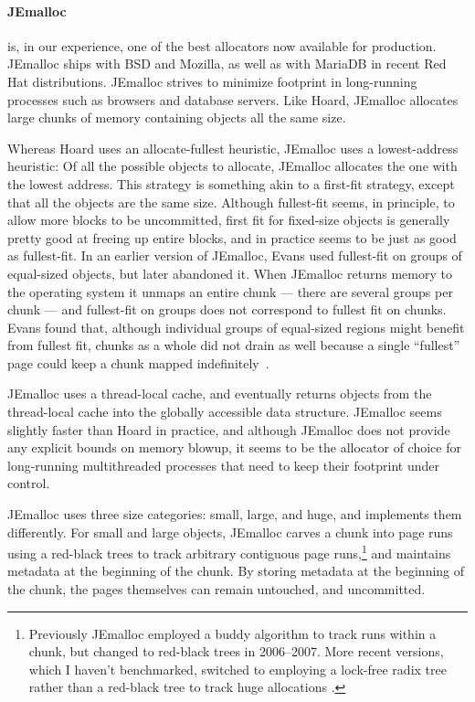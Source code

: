 \documentclass[natbib,sort&compress]{sigplanconf}
\begin{document}
{\paragraph{JEmalloc}} \cite{Evans06} is, in our experience, one of
the best allocators now available for production.  JEmalloc ships with
BSD and Mozilla, as well as with MariaDB in recent Red Hat
distributions.  JEmalloc strives to minimize footprint in long-running
processes such as browsers and database servers.  Like Hoard, JEmalloc
allocates large chunks of memory containing objects all the same size.

Whereas Hoard uses an allocate-fullest heuristic, JEmalloc uses a
lowest-address heuristic: Of all the possible objects to allocate,
JEmalloc allocates the one with the lowest address.  This strategy is
something akin to a first-fit strategy, except that all the objects
are the same size.  Although fullest-fit seems, in principle, to allow
more blocks to be uncommitted, first fit for fixed-size objects is
generally pretty good at freeing up entire blocks, and in practice
seems to be just as good as fullest-fit.  In an earlier version of
JEmalloc, Evans used fullest-fit on groups of equal-sized objects, but
later abandoned it.  When JEmalloc returns memory to the operating
system it unmaps an entire chunk --- there are several groups per
chunk --- and fullest-fit on groups does not correspond to fullest fit
on chunks. Evans found that, although individual groups of equal-sized
regions might benefit from fullest fit, chunks as a whole did not
drain as well because a single ``fullest'' page could keep a chunk
mapped indefinitely~\cite{Evans15-personal-communication}.  

JEmalloc uses a thread-local cache, and eventually returns objects
from the thread-local cache into the globally accessible data
structure.  JEmalloc seems slightly faster than Hoard in practice, and
although JEmalloc does not provide any explicit bounds on memory
blowup, it seems to be the allocator of choice for long-running
multithreaded processes that need to keep their footprint under
control.

JEmalloc uses three size categories: small, large, and huge, and
implements them differently. For small and large objects, JEmalloc
carves a chunk into page runs using a red-black trees to track
arbitrary contiguous page runs,\footnote{Previously JEmalloc employed
  a buddy algorithm to track runs within a chunk, but changed to
  red-black trees in 2006--2007.  More recent versions, which I
  haven't benchmarked, switched to employing a lock-free radix tree
  rather than a red-black tree to track huge allocations
  \cite{Evans15-personal-communication}.} and maintains metadata at
the beginning of the chunk.  By storing metadata at the beginning of
the chunk, the pages themselves can remain untouched, and uncommitted.
\end{document}
